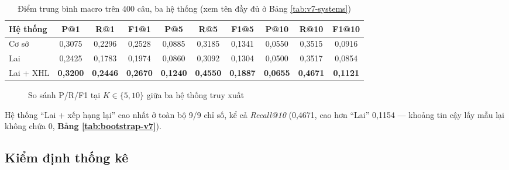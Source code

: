 \begin{table}[ht]
    \centering
    \caption{Điểm trung bình macro trên 400 câu, ba hệ thống (xem tên đầy đủ ở Bảng \ref{tab:v7-systems})}
    \label{tab:results-v7}
    \begin{adjustbox}{width=\textwidth}
        \begin{tabular}{|l|c|c|c|c|c|c|c|c|c|}
            \hline
            \textbf{Hệ thống}     & \textbf{P@1}    & \textbf{R@1}    & \textbf{F1@1}   & \textbf{P@5}    & \textbf{R@5}    & \textbf{F1@5}   & \textbf{P@10}   & \textbf{R@10}   & \textbf{F1@10}  \\
            \hline
            Cơ sở                 & 0,3075          & 0,2296          & 0,2528          & 0,0885          & 0,3185          & 0,1341          & 0,0550          & 0,3515          & 0,0916          \\
            \hline
            Lai                   & 0,2425          & 0,1783          & 0,1974          & 0,0860          & 0,3092          & 0,1304          & 0,0500          & 0,3517          & 0,0854          \\
            \hline
            Lai + XHL             & \textbf{0,3200} & \textbf{0,2446} & \textbf{0,2670} & \textbf{0,1240} & \textbf{0,4550} & \textbf{0,1887} & \textbf{0,0655} & \textbf{0,4671} & \textbf{0,1121} \\
            \hline
        \end{tabular}
    \end{adjustbox}
\end{table}

\begin{figure}[ht]
    \centering
    
    \caption{So sánh P/R/F1 tại $K\in\{5,10\}$ giữa ba hệ thống truy xuất}
    \label{fig:v7-systems}
\end{figure}

\bigbreak\noindent
Hệ thống ``Lai + xếp hạng lại'' cao nhất ở toàn bộ 9/9 chỉ số, kể cả \textit{Recall@10} (0,4671, cao hơn ``Lai'' 0,1154 — khoảng tin cậy lấy mẫu lại không chứa 0, \textbf{Bảng \ref{tab:bootstrap-v7}}).

\subsection{Kiểm định thống kê}\label{sec:kiem-dinh-v7}

